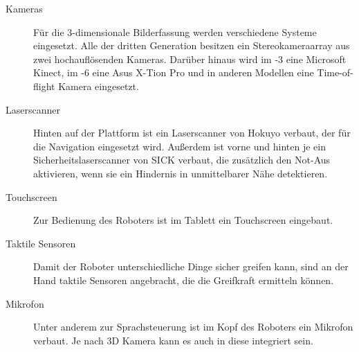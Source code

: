 \begin{description}
  \item[Kameras] Für die 3-dimensionale Bilderfassung werden
    verschiedene Systeme eingesetzt. Alle \cob der dritten Generation
    besitzen ein Stereokameraarray aus zwei hochauflösenden Kameras.
    Darüber hinaus wird im -3 eine Microsoft Kinect, im -6 eine
    Asus X-Tion Pro und in anderen Modellen eine Time-of-flight Kamera
    eingesetzt. 
  \item[Laserscanner] Hinten auf der Plattform ist ein
    Laserscanner von Hokuyo verbaut, der für die Navigation eingesetzt wird.
    Außerdem ist vorne und hinten je ein Sicherheitslaserscanner von SICK
    verbaut, die zusätzlich den Not-Aus aktivieren, wenn sie ein Hindernis in
    unmittelbarer Nähe detektieren. 
  \item[Touchscreen] Zur Bedienung des
    Roboters ist im Tablett ein Touchscreen eingebaut. 
  \item[Taktile Sensoren]
    Damit der Roboter unterschiedliche Dinge sicher greifen kann, sind an der
    Hand taktile Sensoren angebracht, die die Greifkraft ermitteln können.
  \item[Mikrofon] Unter anderem zur Sprachsteuerung ist im Kopf des Roboters ein
    Mikrofon verbaut. Je nach 3D Kamera kann es auch in diese integriert sein.
\end{description}


%
%

